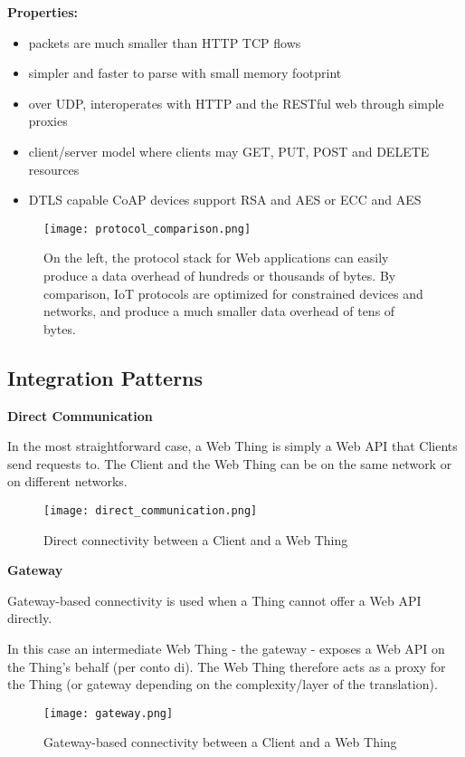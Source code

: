 \textbf{Properties:}

\begin{itemize}
  \item packets are much smaller than HTTP TCP flows
  \item simpler and faster to parse with small memory footprint
  \item over UDP, interoperates with HTTP and the RESTful web through simple
proxies
  \item client/server model where clients may GET, PUT, POST and DELETE
resources
  \item DTLS capable CoAP devices support RSA and AES or ECC and AES
\end{itemize}

\begin{figure}[H]
  \centering
  \texttt{[image: protocol\_comparison.png]}
  \caption{On the left, the protocol stack for Web applications can easily
produce a data overhead of hundreds or thousands of bytes.
By comparison, IoT protocols are optimized for constrained devices and
networks, and produce a much smaller data overhead of tens of bytes.}
  \label{fig:protocol_comparison}
\end{figure}

\subsection{Integration Patterns}

\textbf{Direct Communication}

In the most straightforward case, a Web Thing is simply a Web API that Clients
send requests to.
The Client and the Web Thing can be on the same network or on different
networks.

\begin{figure}[H]
  \centering
  \texttt{[image: direct\_communication.png]}
  \caption{Direct connectivity between a Client and a Web Thing}
  \label{fig:direct_communication}
\end{figure}

\textbf{Gateway}

Gateway-based connectivity is used when a Thing cannot offer a Web API
directly.

In this case an intermediate Web Thing - the gateway - exposes a Web API on the
Thing's behalf (per conto di).
The Web Thing therefore acts as a proxy for the Thing (or gateway depending on
the complexity/layer of the translation).

\begin{figure}[H]
  \centering
  \texttt{[image: gateway.png]}
  \caption{Gateway-based connectivity between a Client and a Web Thing}
  \label{fig:gateway}
\end{figure}

